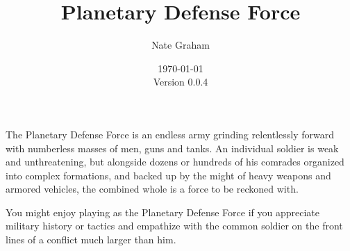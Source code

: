 








\title{Planetary Defense Force}
\author{Nate Graham}
\date{\today\\ Version 0.0.4}

\maketitle

The Planetary Defense Force is an endless army grinding relentlessly forward with numberless masses of men, guns and tanks. An individual soldier is weak and unthreatening, but alongside dozens or hundreds of his comrades organized into complex formations, and backed up by the might of heavy weapons and armored vehicles, the combined whole is a force to be reckoned with.

You might enjoy playing as the Planetary Defense Force if you appreciate military history or tactics and empathize with the common soldier on the front lines of a conflict much larger than him.







\newcommand{\CombatKnife}[1][6+]{Combat Knife: R0 A1 {#1} D0}
\newcommand{\DemoCharges}[1][6+]{Demo Charges: R0 A1 {#1} D6 Critical 9+, Deadly D5+2, Slow, Unstable 1, May only be used against Vehicle or Monster models}
\newcommand{\EnergySword}[1][5+]{Energy Sword: R0 A2 {#1} D6}
\newcommand{\HeavyMeleeWeapon}[1][6+]{Heavy Melee Weapon: R0 A2 {#1} D1}
\newcommand{\HugeMeleeWeapon}[1][4+]{Huge Melee Weapon: R0 A2 {#1} D3 [Deadly 2]}

\newcommand{\BladesAndSaws}[1][7+]{Blades and Saws: R0 A3 {#1} D3 [Deadly 2]}
\newcommand{\CrushingTracks}[1][9+]{Crushing Tracks: R0 A3 {#1} D8 [Deadly 4]}
\newcommand{\ReinforcedRam}[1][6+]{Reinforced Ram: R0 A1 {#1} D5 [Deadly 4]}



